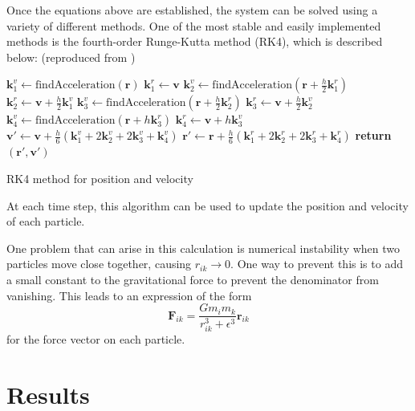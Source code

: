 \documentclass[aps,prc,reprint,floatfix,nobalancelastpage]{revtex4-1}
\begin{document}
    Once the equations above are established, the system can be solved using a variety of different methods. One of the most stable \cite{Project3} and easily implemented \cite{Hjorth-Jensen2016} methods is the fourth-order Runge-Kutta method (RK4), which is described below: (reproduced from \cite{Project3})
    \begin{algorithm}[H]
        \begin{algorithmic}
                \State $\mathbf{k}_1^v \gets \text{findAcceleration}(\mathbf{r})$
                \State $\mathbf{k}_1^r \gets \mathbf{v}$
                \State $\mathbf{k}_2^v \gets \text{findAcceleration}(\mathbf{r} + \frac{h}{2}\mathbf{k}_1^r)$
                \State $\mathbf{k}_2^r \gets \mathbf{v} + \frac{h}{2} \mathbf{k}_1^v$
                \State $\mathbf{k}_3^v \gets \text{findAcceleration}(\mathbf{r} + \frac{h}{2}\mathbf{k}_2^r)$
                \State $\mathbf{k}_3^r \gets \mathbf{v} + \frac{h}{2} \mathbf{k}_2^v$
                \State $\mathbf{k}_4^v \gets \text{findAcceleration}(\mathbf{r} + h\mathbf{k}_3^r)$
                \State $\mathbf{k}_4^r \gets \mathbf{v} + h \mathbf{k}_3^v$
                \State $\mathbf{v}' \gets \mathbf{v} + \frac{h}{6} (\mathbf{k}_1^v + 2\mathbf{k}_2^v + 2\mathbf{k}_3^v + \mathbf{k}_4^v)$
                \State $\mathbf{r}' \gets \mathbf{r} + \frac{h}{6} (\mathbf{k}_1^r + 2\mathbf{k}_2^r + 2\mathbf{k}_3^r + \mathbf{k}_4^r)$
                \State \textbf{return} $(\mathbf{r}', \mathbf{v}')$
            \EndFunction
        \end{algorithmic}
        \caption{RK4 method for position and velocity}
        \label{alg:rk4}
    \end{algorithm}
    At each time step, this algorithm can be used to update the position and velocity of each particle.

    One problem that can arise in this calculation is numerical instability when two particles move close together, causing $r_{ik} \rightarrow 0$. One way to prevent this is to add a small constant to the gravitational force to prevent the denominator from vanishing. This leads to an expression of the form
    \begin{equation}
        \mathbf{F}_{ik} = \frac{G m_i m_k}{r_{ik}^3 + \epsilon^3} \mathbf{r}_{ik} \label{eq:corrforce}
    \end{equation}
    for the force vector on each particle.

\section{Results}
\label{sec:results}
\end{document}
